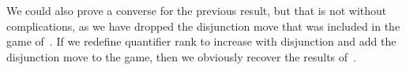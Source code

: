 \documentclass[12pt]{article}
\theoremstyle{definition}
\newtheorem{proposition}[definition]{Proposition}
\newcommand{\wins}{\mathbin{\raisebox{0.8\depth}{$\uparrow$}}}
\newcommand{\playertwo}{\mathrm{\mathbf{II}}}
\DeclareMathOperator{\EF}{EF}
\newcommand{\A}{\mathfrak{A}}
\newcommand{\B}{\mathfrak{B}}
\newcommand\ivee{\mathrel{\rotatebox[origin=c]{270}{$\geqslant$}}}
\newcommand{\posEquiv}{\mathbin{\Rrightarrow}}
\newcommand{\deplog}{\mathcal D}
\begin{document}
We could also prove a converse for the previous result, but that is not without complications, as we have dropped the disjunction move that was included in the game of~\cite{MR2351449}. If we redefine quantifier rank to increase with disjunction and add the disjunction move to the game, then we obviously recover the results of~\cite{MR2351449}.



\end{document}
